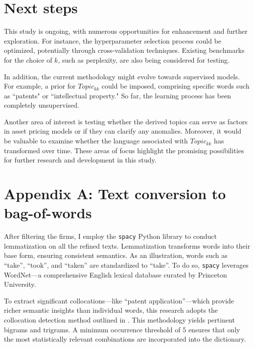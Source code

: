 \documentclass[12pt, letterpaper]{article}
\begin{document}
\section{Next steps}

This study is ongoing, with numerous opportunities for enhancement and further exploration. For instance, the hyperparameter selection process could be optimized, potentially through cross-validation techniques. Existing benchmarks for the choice of $k$, such as perplexity, are also being considered for testing.

In addition, the current methodology might evolve towards supervised models. For example, a prior for $Topic_{kk}$ could be imposed, comprising specific words such as ``patents" or ``intellectual property." So far, the learning process has been completely unsupervised.

Another area of interest is testing whether the derived topics can serve as factors in asset pricing models or if they can clarify any anomalies. Moreover, it would be valuable to examine whether the language associated with $Topic_{kk}$ has transformed over time. These areas of focus highlight the promising possibilities for further research and development in this study.

%
%
%
%
%



\section*{Appendix A: Text conversion to bag-of-words}
\label{bow}

After filtering the firms, I employ the \texttt{spacy} Python library to conduct lemmatization on all the refined texts. Lemmatization transforms words into their base form, ensuring consistent semantics. As an illustration, words such as ``take'', ``took'', and ``taken'' are standardized to ``take''. To do so, \texttt{spacy} leverages WordNet---a comprehensive English lexical database curated by Princeton University.

To extract significant collocations---like ``patent application''---which provide richer semantic insights than individual words, this research adopts the collocation detection method outlined in \cite{Mikolov2013-be}. This methodology yields pertinent bigrams and trigrams. A minimum occurrence threshold of 5 ensures that only the most statistically relevant combinations are incorporated into the dictionary.
\end{document}
